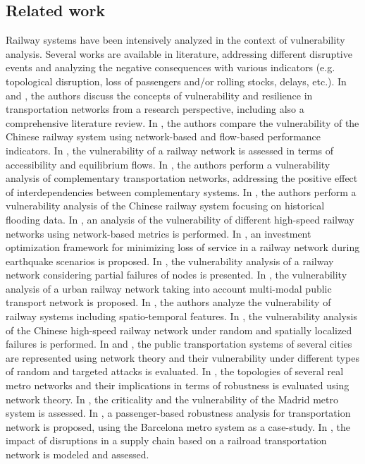 \documentclass[review]{elsarticle}
\begin{document}
	\subsection{Related work}
	Railway systems have been intensively analyzed in the context of vulnerability analysis. Several works are available in literature, addressing different disruptive events and analyzing the negative consequences with various indicators (e.g. topological disruption, loss of passengers and/or rolling stocks, delays, etc.). In \cite{mattsson2015vulnerability} and \cite{reggiani2015transport}, the authors discuss the concepts of vulnerability and resilience in transportation networks from a research perspective, including also a comprehensive literature review. In \cite{ouyang2014comparisons}, the authors compare the vulnerability of the Chinese railway system using network-based and flow-based performance indicators. In \cite{chen2007network}, the vulnerability of a railway network is assessed in terms of accessibility and equilibrium flows. In \cite{ouyang2015vulnerability}, the authors perform a vulnerability analysis of complementary transportation networks, addressing the positive effect of interdependencies between complementary systems. In \cite{hong2015vulnerability}, the authors perform a vulnerability analysis of the Chinese railway system focusing on historical flooding data. In \cite{zhang2016structural}, an analysis of the vulnerability of different high-speed railway networks using network-based metrics is performed. In \cite{yan2017pre}, an investment optimization framework for minimizing loss of service in a railway network during earthquake scenarios is proposed. In \cite{ye2019assessing}, the vulnerability analysis of a railway network considering partial failures of nodes is presented. In \cite{lu2019vulnerability}, the vulnerability analysis of a urban railway network taking into account multi-modal public transport network is proposed. In \cite{hong2019spatiotemporal}, the authors analyze the vulnerability of railway systems including  spatio-temporal features. In \cite{fang2020vulnerability}, the vulnerability analysis of the Chinese high-speed railway network under random and spatially localized failures is performed. In \cite{berche2009resilience} and \cite{berche2012transportation}, the public transportation systems of several cities are represented using network theory and their vulnerability under different types of random and targeted attacks is evaluated. In \cite{derrible2010complexity}, the topologies of several real metro networks and their implications in terms of robustness is evaluated using network theory. In \cite{rodriguez2014measuring}, the criticality and the vulnerability of the Madrid metro system is assessed. In \cite{de2012evaluating}, a passenger-based robustness analysis for transportation network is proposed, using the Barcelona metro system as a case-study. In \cite{gedik2014vulnerability}, the impact of disruptions in a supply chain based on a railroad transportation network is modeled and assessed.
	
\end{document}
